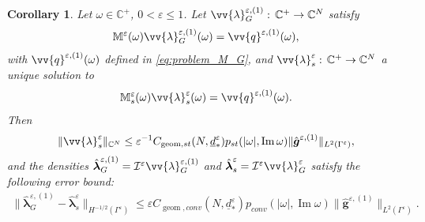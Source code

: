 \documentclass[]{article}
\newtheorem{corollary}{Corollary}
\numberwithin{equation}{section}
\numberwithin{theorem}{section}
\numberwithin{lemma}{section}
\numberwithin{corollary}{section}
\numberwithin{proposition}{section}
\numberwithin{definition}{section}
\newcommand{\blambda}{\boldsymbol{\lambda}}
\newcommand{\re}{\varepsilon}
\renewcommand{\vec}{\boldsymbol}
\renewcommand{\Im}{\operatorname{Im}}
\begin{document}
	\begin{corollary}
		\label{cor:freq_fin}	
		Let $\omega\in \mathbb{C}^+$, $0<\re\leq 1$. 
		Let $\vv{\lambda}_G^{\re, (1)}: \, \mathbb{C}^+\rightarrow \mathbb{C}^N$ satisfy 
		\begin{align*}%
			{\mathbb{M}}^{\re}(\omega)\vv{\lambda}^{\re,(1)}_G(\omega)=\vv{q}^{\re,(1)}(\omega),
		\end{align*}
		with $\vv{q}^{\re,(1)}(\omega)$ defined in \eqref{eq:problem_M_G},	and $\vv{\lambda}^{\re}_s: \, \mathbb{C}^+\rightarrow \mathbb{C}^N$  a unique solution to
		\begin{align}%
			\label{eq:ds}
			\mathbb{M}^{\re}_s(\omega)\vv{\lambda}^{\re}_s(\omega)=\vv{q}^{\re, (1)}(\omega).
		\end{align}
		Then 
		\begin{align} 
			\label{eq:bound_density_simplified}
			\|\vv{\lambda}^{\re}_s\|_{\mathbb{C}^N} \leq\re^{-1} C_{\operatorname{geom},st}(N, \underline{d}^{\re}_*)p_{st}(|\omega|, \Im \omega) \|\hat{\vec{g}}^{\re,(1)}\|_{L^2(\Gamma^{\re})}, 
		\end{align}
		and the densities $\hat{\blambda}_G^{\re,(1)}=\mathcal{I}^{\re}\vv{\lambda}_G^{\re,(1)}$ and $\hat{\blambda}_s^{\re}=\mathcal{I}^{\re}\vv{\lambda}_G^{\re}$ satisfy the following error bound:
		\begin{align}
			\label{eq:lmb}
			\|\hat{\vec{\lambda}}^{\re, (1)}_G-\hat{\vec{\lambda}}^{\re}_s \|_{H^{-1/2}(\Gamma^{\re})}\leq \re  C_{\operatorname{geom},conv}(N, \underline{d}^{\re}_*)p_{conv}(|\omega|, \Im \omega) \|\hat{\vec{g}}^{\re,(1)}\|_{L^2(\Gamma^{\re})}.
		\end{align}
	\end{corollary}
\end{document}
